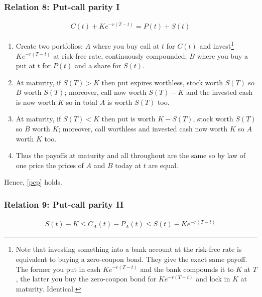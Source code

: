 \documentclass[9pt]{extarticle}
\begin{document}
\subsubsection{Relation 8: Put-call parity I}

\begin{align}\label{pcp}
  C(t) + Ke^{-r(T-t)} = P(t) + S(t)
\end{align}

\begin{enumerate}
  \item Create two portfolios: $A$ where you buy call at $t$ for $C(t)$ and invest\footnote{Note that investing something into a bank account at the risk-free rate is equivalent 
  to buying a zero-coupon bond. They give the exact same payoff. The former you put in cash $Ke^{-r(T-t)}$ and the bank compounds it to $K$ at $T$, the latter you buy the zero-coupon 
  bond for $Ke^{-r(T-t)}$ and lock in $K$ at maturity. Identical.} $Ke^{-r(T-t)}$ at risk-free rate, continuously compounded; $B$ where you 
  buy a put at $t$ for $P(t)$ and a share for $S(t)$.
  \item At maturity, if $S(T) >K$ then put expires worthless, stock worth $S(T)$ so $B$ worth $S(T)$; moreover, call now worth $S(T)-K$ and the invested cash is now worth 
  $K$ so in total $A$ is worth $S(T)$ too.
  \item At maturity, if $S(T)<K$ then put is worth $K-S(T)$, stock worth $S(T)$ so $B$ worth $K$; moreover, call worthless and invested cash now worth $K$ so $A$ worth $K$ too.
  \item Thus the payoffs at maturity and all throughout are the same so by law of one price the prices of $A$ and $B$ today at $t$ are equal.
\end{enumerate}
Hence, \eqref{pcp} holds.

\subsubsection{Relation 9: Put-call parity II}

\begin{align}\label{pcp2}
  S(t) - K \leq C_A(t) - P_A(t) \leq S(t) - Ke^{-r(T-t)} 
\end{align}
\end{document}
